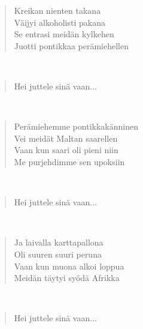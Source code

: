 \noindent\begin{minipage}{\linewidth}
\begin{verse}
	Kreikan nienten takana\\
	Väijyi alkoholisti pakana\\
	Se entrasi meidän kylkehen\\
	Juotti pontikkaa perämiehellen\\
\end{verse}
\end{minipage}\\[10pt]
\noindent\begin{minipage}{\linewidth}
\begin{verse}
	Hei juttele sinä vaan...\\
\end{verse}
\end{minipage}\\[10pt]
\noindent\begin{minipage}{\linewidth}
\begin{verse}
	Perämiehemme pontikkakänninen\\
	Vei meidät Maltan saarellen\\
	Vaan kun saari oli pieni niin\\
	Me purjehdimme sen upoksiin\\
\end{verse}
\end{minipage}\\[10pt]
\noindent\begin{minipage}{\linewidth}
\begin{verse}
	Hei juttele sinä vaan...\\
\end{verse}
\end{minipage}\\[10pt]
\noindent\begin{minipage}{\linewidth}
\begin{verse}
	Ja laivalla karttapallona\\
	Oli suuren suuri peruna\\
	Vaan kun muona alkoi loppua\\
	Meidän täytyi syödä Afrikka\\
\end{verse}
\end{minipage}\\[10pt]
\noindent\begin{minipage}{\linewidth}
\begin{verse}
	Hei juttele sinä vaan...\\
\end{verse}
\end{minipage}\\[10pt]
